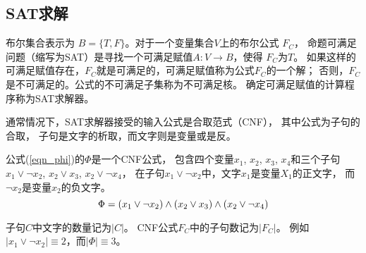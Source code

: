 \subsection{SAT求解}
布尔集合表示为 $B=\{T,F\}$。对于一个变量集合$V$上的布尔公式 $F_C$，
命题可满足问题（缩写为SAT）是寻找一个可满足赋值$A : V\to B$，使得 $F_C$为$T$。
如果这样的可满足赋值存在，$F_C$就是可满足的，可满足赋值称为公式$F_C$的一个解；
否则，$F_C$是不可满足的。公式的不可满足子集称为不可满足核。
确定可满足赋值的计算程序称为SAT求解器\cite{Minisat}。

通常情况下，SAT求解器接受的输入公式是合取范式（CNF），
其中公式为子句的合取，
子句是文字的析取，而文字则是变量或是反。

公式(\ref{eqn_phi})的$\Phi$是一个CNF公式，
包含四个变量$x_1$, $x_2$, $x_3$, $x_4$和三个子句 $x_1\vee \neg x_2$, $x_2\vee x_3$, $x_2\vee \neg x_4$，
在子句$x_1\vee \neg x_2$中，文字$x_1$是变量$X_1$的正文字，
而$\neg x_2$是变量$x_2$的负文字。
\begin{equation}\label{eqn_phi}
\centering \Phi=(x_1\vee \neg x_2)
\wedge(x_2\vee x_3)
\wedge(x_2\vee \neg x_4)
\end{equation}

子句$C$中文字的数量记为$|C|$。
CNF公式$F_C$中的子句数记为$|F_C|$。
例如$| x_1\vee  \neg x_2 |\equiv 2$，而$|\Phi|\equiv 3$。

